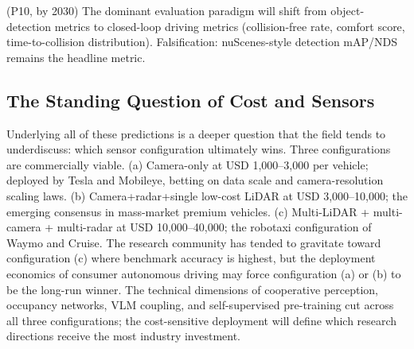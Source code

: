 \documentclass{article}
\begin{document}
(P10, by 2030) The dominant evaluation paradigm will shift from object-detection metrics to closed-loop driving metrics (collision-free rate, comfort score, time-to-collision distribution). Falsification: nuScenes-style detection mAP/NDS remains the headline metric.

\subsection{The Standing Question of Cost and Sensors}\label{the-standing-question-of-cost-and-sensors}

Underlying all of these predictions is a deeper question that the field tends to underdiscuss: which sensor configuration ultimately wins. Three configurations are commercially viable. (a) Camera-only at USD 1,000--3,000 per vehicle; deployed by Tesla and Mobileye, betting on data scale and camera-resolution scaling laws. (b) Camera+radar+single low-cost LiDAR at USD 3,000--10,000; the emerging consensus in mass-market premium vehicles. (c) Multi-LiDAR + multi-camera + multi-radar at USD 10,000--40,000; the robotaxi configuration of Waymo and Cruise. The research community has tended to gravitate toward configuration (c) where benchmark accuracy is highest, but the deployment economics of consumer autonomous driving may force configuration (a) or (b) to be the long-run winner. The technical dimensions of cooperative perception, occupancy networks, VLM coupling, and self-supervised pre-training cut across all three configurations; the cost-sensitive deployment will define which research directions receive the most industry investment.
\end{document}
